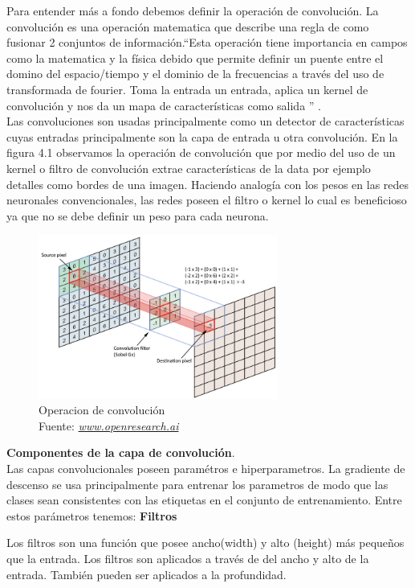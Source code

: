 Para entender más a fondo debemos definir la operación de convolución.  La convolución es una operación matematica que describe una regla de como fusionar 2 conjuntos de información.\textquotedblleft Esta operación tiene importancia en campos como la matematica y la física debido que permite definir un puente entre el domino del espacio/tiempo y el dominio de la frecuencias a través del uso de transformada de fourier. Toma la entrada un entrada, aplica un kernel de convolución y nos da un mapa de características como salida \textquotedblright \cite{book1} .\\
Las convoluciones son usadas principalmente como un detector de características cuyas entradas principalmente son la capa de entrada u otra convolución.
En la figura 4.1 observamos la operación de convolución que por medio del uso de un kernel o filtro de convolución extrae características de la data por ejemplo detalles como bordes de una imagen. Haciendo analogía con los pesos en las redes neuronales convencionales, las redes poseen el filtro o kernel lo cual es beneficioso ya que no se debe definir un peso para cada neurona.
\begin{figure}[H]
	\centering
	\includegraphics[width=0.7\textwidth]{Figures/convolucion.jpeg}
	\caption{Operacion de convolución \\ Fuente:  \href{http://openresearch.ai/t/network-in-network/39}{\textit{www.openresearch.ai}}}
	\label{convolucion}
\end{figure} 

\textbf{Componentes de la capa de convolución}.\\	
Las capas convolucionales poseen paramétros e hiperparametros. La gradiente de descenso se usa principalmente para entrenar los parametros de modo que las clases sean consistentes con las etiquetas en el conjunto de entrenamiento. Entre estos parámetros tenemos:
\textbf{Filtros}

Los filtros son una función que posee ancho(width) y alto (height) más pequeños que la entrada. Los filtros son aplicados a través de  del ancho y alto de la entrada. También pueden ser aplicados a la profundidad.

